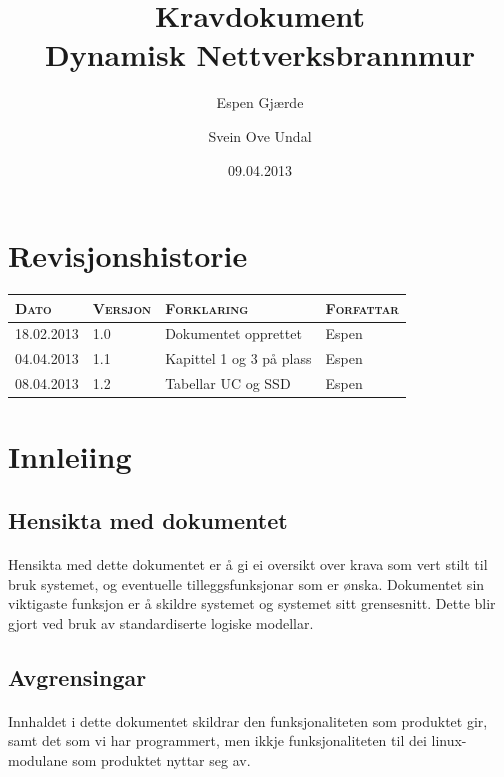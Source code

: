\documentclass[nynorsk,12pt,a4paper]{article}
\title{Kravdokument\\
Dynamisk Nettverksbrannmur
}
\author{Espen Gjærde \and Svein Ove Undal}
\date{09.04.2013}
\begin{document}
\maketitle

\newpage
\section*{Revisjonshistorie}
\begin{table}[h!]
	\begin{tabular}{ l l l l }

		\textsc{Dato} & \textsc{Versjon} & \textsc{Forklaring} & \textsc{Forfattar} \\
		\hline 
		18.02.2013 & 1.0 & Dokumentet opprettet & Espen \\ 
		04.04.2013 & 1.1 & Kapittel 1 og 3 på plass & Espen \\ 
		08.04.2013 & 1.2 & Tabellar UC og SSD & Espen \\ 
		\hline
	\end{tabular}
\end{table}

\newpage
\tableofcontents

\newpage
\section{Innleiing}
\subsection{Hensikta med dokumentet}
\paragraph{}
Hensikta med dette dokumentet er å gi ei oversikt over krava som vert stilt til bruk systemet, og eventuelle tilleggsfunksjonar som er ønska. Dokumentet sin viktigaste funksjon er å skildre systemet og systemet sitt grensesnitt. Dette blir gjort ved bruk av standardiserte logiske modellar. 

\subsection{Avgrensingar}
\paragraph{}
Innhaldet i dette dokumentet skildrar den funksjonaliteten som produktet gir, samt det som vi har programmert,  men ikkje funksjonaliteten til dei linux-modulane som produktet nyttar seg av. 
\end{document}
